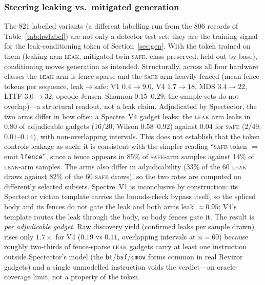 \documentclass[conference]{IEEEtran}
\begin{document}
\subsubsection{Steering leaking vs.\ mitigated generation}
\label{sec:leakcond-results}
The 821 labelled variants (a different labelling run from the 806 records of Table~\ref{tab:hwlabel}) are not only a detector test set; they are the
training signal for the leak-conditioning token of Section~\ref{sec:gen}. With
the token trained on them (leaking arm \textsc{leak}, mitigated twin
\textsc{safe}, class preserved; held out by base), conditioning moves generation
as intended. Structurally, across all four hardware classes the \textsc{leak}
arm is fence-sparse and the \textsc{safe} arm heavily fenced (mean fence tokens
per sequence, leak$\to$safe: V1 $0.4\!\to\!9.0$, V4 $1.7\!\to\!18$, MDS
$3.4\!\to\!22$, L1TF $3.0\!\to\!32$; opcode Jensen--Shannon $0.15$--$0.29$; the
sample sets do not overlap)---a structural readout, not a leak claim. Adjudicated
by Spectector, the two arms differ in how often a Spectre~V4 gadget leaks: the
\textsc{leak} arm leaks in $0.80$ of adjudicable gadgets (16/20, Wilson
$0.58$--$0.92$) against $0.04$ for \textsc{safe} (2/49, $0.01$--$0.14$), with
non-overlapping intervals. This does not establish that the token controls
leakage as such: it is consistent with the simpler reading ``\textsc{safe}
token $\Rightarrow$ emit \texttt{lfence}'', since a fence appears in 85\% of
\textsc{safe}-arm samples against 14\% of \textsc{leak}-arm samples. The arms
also differ in adjudicability (33\% of the 60 \textsc{leak} draws against 82\%
of the 60 \textsc{safe} draws), so the two rates are computed on differently
selected subsets.
Spectre~V1 is inconclusive by
construction: its Spectector victim template carries the bounds-check bypass
itself, so the spliced body and its fences do not gate the leak and both arms
leak $\approx\!0.95$; V4's template routes the leak through the body, so body
fences gate it. The result is \emph{per adjudicable gadget}. Raw discovery yield
(confirmed leaks per sample drawn) rises only $1.7\times$ for V4 ($0.19$ vs
$0.11$, overlapping intervals at $n{=}60$) because roughly two-thirds of
fence-sparse \textsc{leak} gadgets carry at least one instruction outside
Spectector's model (the \texttt{bt}/\texttt{bsf}/\texttt{cmov} forms common in
real Revizor gadgets) and a single unmodelled instruction voids the verdict---an
oracle-coverage limit, not a property of the token.
\end{document}
